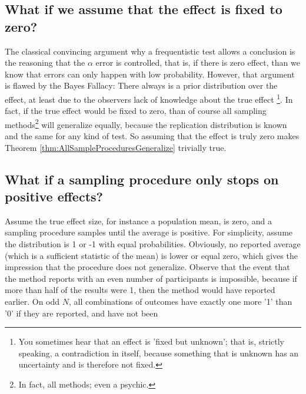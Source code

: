 \documentclass[man]{apa7}
\theoremstyle{definition}
\begin{document}
\subsection{What if we assume that the effect is fixed to zero?}
The classical convincing argument why a frequentistic test allows a conclusion is the reasoning that the $\alpha$ error is controlled, that is, if there is zero effect, than we know that errors can only happen with low probability. However, that argument is flawed by the Bayes Fallacy: There always is a prior distribution over the effect, at least due to the observers lack of knowledge about the true effect \footnote{You sometimes hear that an effect is 'fixed but unknown'; that is, strictly speaking, a contradiction in itself, because something that is unknown has an uncertainty and is therefore not fixed.}. In fact, if the true effect would be fixed to zero, than of course all sampling methods\footnote{In fact, all methods; even a psychic.} will generalize equally, because the replication distribution is known and the same for any kind of test. So assuming that the effect is truly zero makes Theorem \ref{thm:AllSampleProceduresGeneralize} trivially true.

\subsection{What if a sampling procedure only stops on positive effects?}
Assume the true effect size, for instance a population mean, is zero, and a sampling procedure samples until the average is positive. For simplicity, assume the distribution is 1 or -1 with equal probabilities. Obviously, no reported average (which is a sufficient statistic of the mean) is lower or equal zero, which gives the impression that the procedure does not generalize. Observe that the event that the method reports with an even number of participants is impossible, because if more than half of the results were 1, then the method would have reported earlier. On odd $N$, all combinations of outcomes have exactly one more '1' than '0' if they are reported, and have not been %
\end{document}

